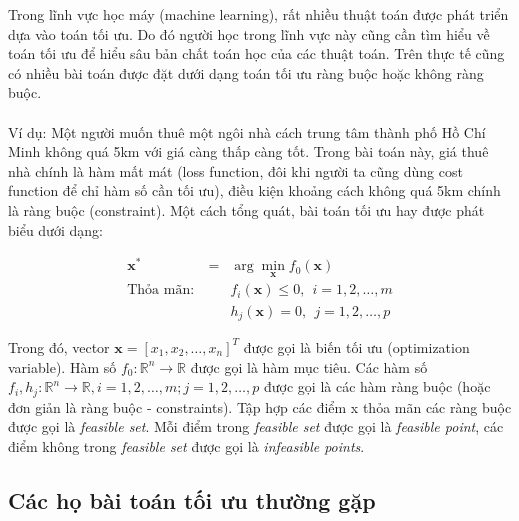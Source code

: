 \documentclass[a4paper, 12pt, oneside]{report}
\begin{document}
Trong lĩnh vực học máy (machine learning), rất nhiều thuật toán được phát triển dựa vào toán tối ưu. Do đó người học trong lĩnh vực này cũng cần tìm hiểu về toán tối ưu để hiểu sâu bản chất toán học của các thuật toán. Trên thực tế cũng có nhiều bài toán được đặt dưới dạng toán tối ưu ràng buộc hoặc không ràng buộc.\\ \\
Ví dụ: Một người muốn thuê một ngôi nhà cách trung tâm thành phố Hồ Chí Minh không quá 5km với giá càng thấp càng tốt. Trong bài toán này, giá thuê nhà chính là hàm mất mát (loss function, đôi khi người ta cũng dùng cost function để chỉ hàm số cần tối ưu), điều kiện khoảng cách không quá 5km chính là ràng buộc (constraint). Một cách tổng quát, bài toán tối ưu hay được phát biểu dưới dạng: \\
\begin{mybox}
\begin{eqnarray}
\mathbf{x}^* &=& \arg\min_{\mathbf{x}} f_0(\mathbf{x})\\
\text{Thỏa mãn:}~ && f_i(\mathbf{x}) \leq 0, ~~ i = 1, 2, \dots, m \\
&& h_j(\mathbf{x}) = 0, ~~ j = 1, 2, \dots, p
\end{eqnarray}
\end{mybox}
Trong đó, vector $\mathbf{x} = [x_1, x_2, \dots, x_n]^T$ được gọi là biến tối ưu (optimization variable). Hàm số $f_0: \mathbb{R}^n \rightarrow \mathbb{R}$ được gọi là hàm mục tiêu. Các hàm số $f_i, h_j: \mathbb{R}^n \rightarrow \mathbb{R}, i = 1, 2, \dots, m; j = 1, 2, \dots, p$ được gọi là các hàm ràng buộc (hoặc đơn giản là ràng buộc - constraints). Tập hợp các điểm x thỏa mãn các ràng buộc được gọi là \textit{feasible set}. Mỗi điểm trong \textit{feasible set} được gọi là \textit{feasible point}, các điểm không trong \textit{feasible set} được gọi là \textit{infeasible points}.

\subsection{Các họ bài toán tối ưu thường gặp}
\end{document}
